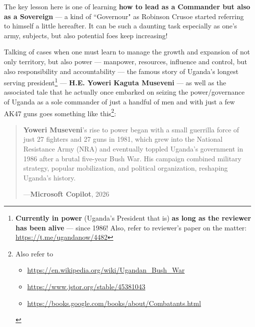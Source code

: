 \documentclass[a4paper]{article}
\begin{document}
The key lesson here is one of learning \textbf{how to lead as a Commander but also as a Sovereign} --- a kind of ``Governour" as Robinson Crusoe started referring to himself a little hereafter. It can be such a daunting task especially as one's army, subjects, but also potential foes keep increasing! 

Talking of cases when one must learn to manage the growth and expansion of not only territory, but also power --- manpower, resources, influence and control, but also responsibility and accountability --- the famous story of Uganda's longest serving president\footnote{\textbf{Currently in power} (Uganda's President that is) \textbf{as long as the reviewer has been alive} --- since 1986! Also, refer to reviewer's paper on the matter:\\ \url{https://t.me/ugandanow/4482}} --- \textbf{H.E. Yoweri Kaguta Museveni} --- as well as the associated tale that he actually once embarked on seizing the power/governance of Uganda as a sole commander of just a handful of men and with just a few AK47 guns goes something like this\footnote{Also refer to \begin{itemize}
\item \url{https://en.wikipedia.org/wiki/Ugandan_Bush_War}
\item \url{https://www.jstor.org/stable/45381043}
\item \url{https://books.google.com/books/about/Combatants.html}
\end{itemize}}:



\noindent
\begin{minipage}{1\textwidth}
\vspace{1em}
\begin{quotation}
{\ttfamily

\textbf{Yoweri Museveni}'s rise to power began with a small guerrilla force of just 27 fighters and 27 guns in 1981, which grew into the National Resistance Army (NRA) and eventually toppled Uganda’s government in 1986 after a brutal five-year Bush War. His campaign combined military strategy, popular mobilization, and political organization, reshaping Uganda’s history.


}
\hspace*{\fill} ---\textbf{Microsoft Copilot}, 2026\cite{copilot_assistant}
\end{quotation}
\vspace{1em}
\end{minipage}
\end{document}
